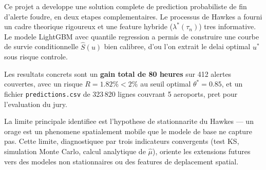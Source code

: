 \documentclass[a4paper,11pt]{article}
\begin{document}
Ce projet a developpe une solution complete de prediction probabiliste de fin
d'alerte foudre, en deux etapes complementaires. Le processus de Hawkes a
fourni un cadre theorique rigoureux et une feature hybride ($\lambda^*(\tau_n)$)
tres informative. Le modele LightGBM avec quantile regression a permis de
construire une courbe de survie conditionnelle $\hat{S}(u)$ bien calibree, d'ou
l'on extrait le delai optimal $u^*$ sous risque controle.

Les resultats concrets sont un \textbf{gain total de 80 heures} sur 412 alertes
couvertes, avec un risque $R = 1.82\% < 2\%$ au seuil optimal $\theta^* = 0.85$,
et un fichier \texttt{predictions.csv} de 323\,820 lignes couvrant 5 aeroports,
pret pour l'evaluation du jury.

La limite principale identifiee est l'hypothese de stationnarite du Hawkes ---
un orage est un phenomene spatialement mobile que le modele de base ne capture
pas. Cette limite, diagnostiquee par trois indicateurs convergents (test KS,
simulation Monte Carlo, calcul analytique de $\hat\mu$), oriente les extensions
futures vers des modeles non stationnaires ou des features de deplacement
spatial.
\end{document}
